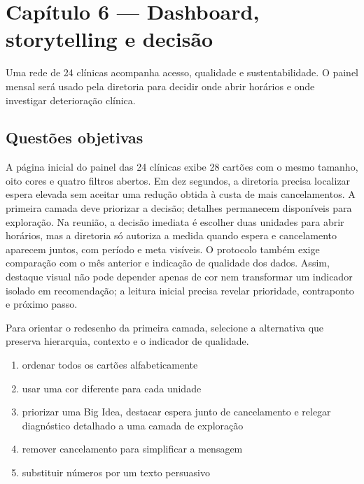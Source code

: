 \section{Capítulo 6 --- Dashboard, storytelling e decisão}

Uma rede de 24 clínicas acompanha acesso, qualidade e sustentabilidade. O painel mensal será usado pela diretoria para decidir onde abrir horários e onde investigar deterioração clínica.

\subsection{Questões objetivas}


\TextoBase

A página inicial do painel das 24 clínicas exibe 28 cartões com o mesmo tamanho, oito cores e quatro filtros abertos. Em dez segundos, a diretoria precisa localizar espera elevada sem aceitar uma redução obtida à custa de mais cancelamentos. A primeira camada deve priorizar a decisão; detalhes permanecem disponíveis para exploração. Na reunião, a decisão imediata é escolher duas unidades para abrir horários, mas a diretoria só autoriza a medida quando espera e cancelamento aparecem juntos, com período e meta visíveis. O protocolo também exige comparação com o mês anterior e indicação de qualidade dos dados. Assim, destaque visual não pode depender apenas de cor nem transformar um indicador isolado em recomendação; a leitura inicial precisa revelar prioridade, contraponto e próximo passo.

\FonteDidatica

\Comando Para orientar o redesenho da primeira camada, selecione a alternativa que preserva hierarquia, contexto e o indicador de qualidade.

\begin{enumerate}[label=\Alph*)]

\item ordenar todos os cartões alfabeticamente

\item usar uma cor diferente para cada unidade

\item priorizar uma Big Idea, destacar espera junto de cancelamento e relegar diagnóstico detalhado a uma camada de exploração

\item remover cancelamento para simplificar a mensagem

\item substituir números por um texto persuasivo

\end{enumerate}

